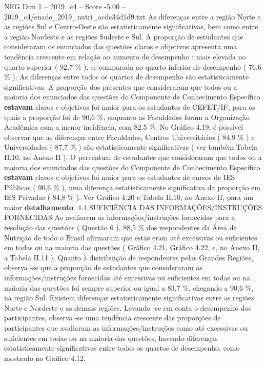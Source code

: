 \begin{textsample}{NEG Dim 1 – 2019\_c4 – Score -5.00 – 2019\_c4/enade\_2019\_nutri\_acdc34d1d9.txt}
As diferenças entre a região Norte e as regiões Sul e Centro-Oeste são estatisticamente significativas, bem como entre a região Nordeste e as regiões Sudeste e Sul.
A proporção de estudantes que consideraram os enunciados das questões claros e objetivos apresenta uma tendência crescente em relação ao aumento de desempenho : mais elevada no quarto superior ( 92,7 \% ), se comparada ao quarto inferior de desempenho ( 76,6 \% ).
As diferenças entre todos os quartos de desempenho são estatisticamente significativas.
A proporção dos presentes que consideraram que todos ou a maioria dos enunciados das questões do Componente de Conhecimento Específico \textbf{estavam} claros e objetivos foi maior para os estudantes de CEFET/IF, para os quais a proporção foi de 90,6 \%, enquanto as Faculdades foram a Organização Acadêmica com a menor incidência, com 82,5 \%.
No Gráfico 4.19, é possível observar que as diferenças entre Faculdades, Centros Universitários ( 84,9 \% ) e Universidades ( 87,7 \% ) são estatisticamente significativas ( ver também Tabela II.10, no Anexo II ).
O percentual de estudantes que consideraram que todos ou a maioria dos enunciados das questões do Componente de Conhecimento Específico \textbf{estavam} claros e objetivos foi maior para os estudantes de cursos de IES Públicas ( 90,6 \% ), uma diferença estatisticamente significativa da proporção em IES Privadas ( 84,8 \% ).
Ver Gráfico 4.20 e Tabela II.10, no Anexo II, para um maior \textbf{detalhamento}. 4.4 SUFICIÊNCIA DAS INFORMAÇÕES/INSTRUÇÕES FORNECIDAS Ao avaliarem as informações/instruções fornecidas para a resolução das questões ( Questão 6 ), 88,5 \% dos respondentes da Área de Nutrição de todo o Brasil afirmaram que estas eram até excessivas ou suficientes em todas ou na maioria das questões ( Gráfico 4.21, Gráfico 4.22, e, no Anexo II, a Tabela II.11 ).
Quanto à distribuição de respondentes pelas Grandes Regiões, observa -se que a proporção de estudantes que consideraram as informações/instruções fornecidas até excessivas ou suficientes em todas ou na maioria das questões foi sempre superior ou igual a 83,7 \%, chegando a 90,6 \%, na região Sul.
Existem diferenças estatisticamente significativas entre as regiões Norte e Nordeste e as demais regiões.
Levando -se em conta o desempenho dos participantes, observa -se uma tendência crescente das proporções de participantes que avaliaram as informações/instruções como até excessivas ou suficientes em todas ou na maioria das questões, havendo diferenças estatisticamente significativas entre todos os quartos de desempenho, como mostrado no Gráfico 4.12.

\end{textsample}
